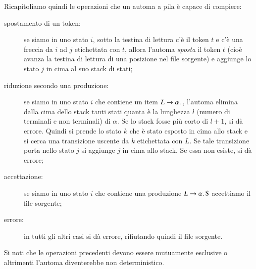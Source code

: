 Ricapitoliamo quindi le operazioni che un automa a pila \`e capace di compiere:
%
\begin{description}
\item[spostamento di un token:] se siamo in uno stato $i$, sotto la
  testina di lettura c'\`e il token $t$ e c'\`e una freccia da $i$ ad
  $j$ etichettata con $t$, allora l'automa \emph{sposta} il token $t$
  (cio\`e avanza la testina di lettura di una posizione nel file sorgente)
  e aggiunge lo stato $j$ in cima al suo stack di stati;
\item[riduzione secondo una produzione:] se siamo in uno stato $i$ che
  contiene un item $L\to\alpha.\,$, l'automa elimina dalla cima dello stack
  tanti stati quanta \`e la lunghezza $l$ (numero di terminali e non terminali)
  di $\alpha$. Se lo stack fosse pi\`u corto di $l+1$, si d\`a errore. Quindi
  si prende lo stato $k$ che \`e stato esposto in cima allo stack e si cerca
  una transizione uscente da $k$ etichettata con $L$. Se tale transizione
  porta nello stato $j$ si aggiunge $j$ in cima allo stack. Se essa non
  esiste, si d\`a errore;
\item[accettazione:] se siamo in uno stato $i$ che contiene una produzione
  $L\to\alpha.\,\mathtt{\$}$ accettiamo il file sorgente;
\item[errore:] in tutti gli altri casi si d\`a errore, rifiutando quindi il
  file sorgente.
\end{description}
%
Si noti che le operazioni precedenti devono essere mutuamente esclusive
o altrimenti l'automa diventerebbe non deterministico.

